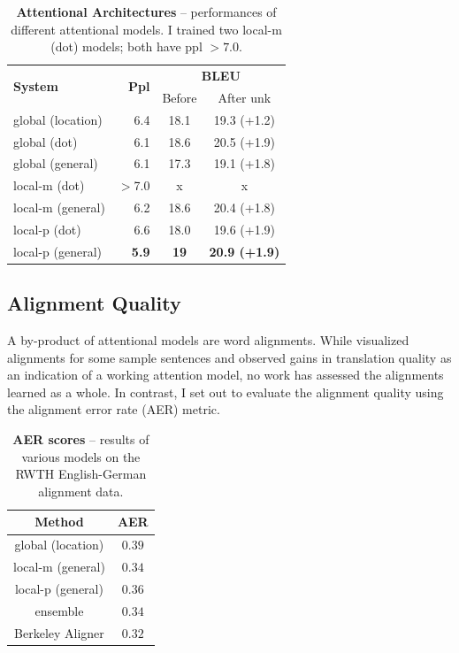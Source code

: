\begin{table}
\centering
\begin{tabular}{l|r|c|c}
\multirow{ 2}{*}{\bf{System}} & \multirow{ 2}{*}{\bf{Ppl}} &
\multicolumn{2}{c}{{\bf BLEU}}\\
\cline{3-4}
& & Before & After unk \\
  \hline
global (location) & 6.4 & 18.1 & 19.3 (+1.2) \\
global (dot) & 6.1 & 18.6 & 20.5 (+1.9) \\
global (general) & 6.1 & 17.3 & 19.1 (+1.8) \\
  \hline
local-m (dot) & $>$7.0 & x & x \\
local-m (general) & 6.2 & 18.6 & 20.4 (+1.8) \\
  \hline
local-p (dot) & 6.6 & 18.0 & 19.6 (+1.9) \\
local-p (general) & {\bf 5.9} & {\bf 19} & {\bf 20.9 (+1.9)} \\
\end{tabular}
\caption[Attentional Architectures]{{\bf Attentional Architectures} -- performances of different
attentional
models. I trained two local-m (dot) models; both have
ppl $>7.0$.}
\label{t:attnChoices}
\end{table}

\subsection{Alignment Quality}
A by-product of attentional models are word alignments. While \cite{bog15}
visualized alignments for some sample sentences and 
observed gains in translation quality as an indication of a working attention
model, no work has assessed the alignments learned as a whole. In contrast, I
set out to evaluate the alignment quality using the alignment error rate (AER)
metric.

\begin{table}
  \begin{center}
    \begin{tabular}{c c}
      {\bf Method} & {\bf AER} \\
      \hline
      global (location) & $0.39$ \\
      local-m (general)  & $0.34$ \\
      local-p (general) & $0.36$ \\
      \hdashline
      ensemble & $0.34$ \\
      \hline
      Berkeley Aligner & $0.32$ \\
    \end{tabular}
  \end{center}
  \caption[AER scores]{{\bf AER scores} -- results of various models on the RWTH
  English-German alignment data.}
  \label{t:alignment}
\end{table}

